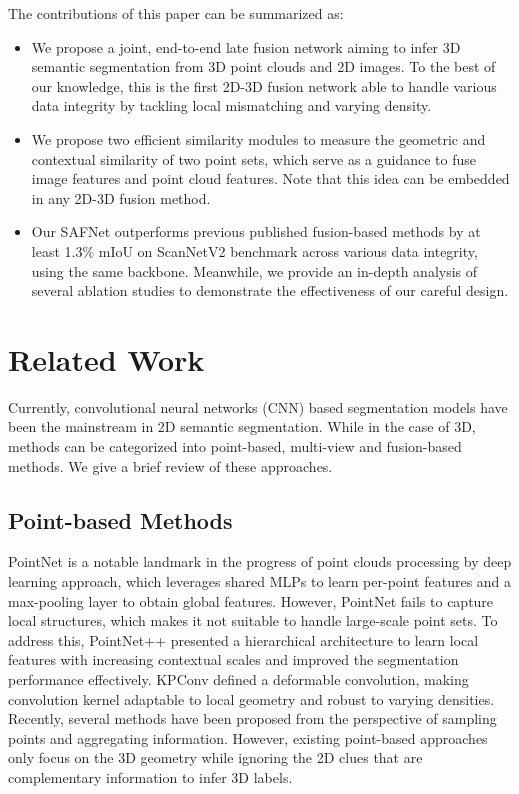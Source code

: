 \documentclass[letterpaper, 10 pt, conference]{ieeeconf}
\begin{document}
The contributions of this paper can be summarized as:
\begin{itemize}

\item We propose a joint, end-to-end late fusion network aiming to infer 3D semantic segmentation from 3D point clouds and 2D images. To the best of our knowledge, this is the first 2D-3D fusion network able to handle various data integrity by tackling local mismatching and varying density.
\item We propose two efficient similarity modules to measure the geometric and contextual similarity of two point sets, which serve as a guidance to fuse image features and point cloud features. Note that this idea can be embedded in any 2D-3D fusion method.
\item  Our SAFNet outperforms previous published fusion-based methods by at least 1.3\% mIoU on ScanNetV2 benchmark across various data integrity, using the same backbone. Meanwhile, we provide an in-depth analysis of several ablation studies to demonstrate the effectiveness of our careful design.

\end{itemize}




\section{Related Work}

Currently, convolutional neural networks (CNN) based segmentation models have been the mainstream in 2D semantic segmentation. While in the case of 3D, methods can be categorized into point-based, multi-view and fusion-based methods. We give a brief review of these approaches.

\subsection{Point-based Methods}


 PointNet \cite{qi2017pointnet} is a notable landmark in the progress of point clouds processing \cite{guo2020deep} by deep learning approach, which leverages shared MLPs to learn per-point features and a max-pooling layer to obtain global features. However, PointNet fails to capture local structures, which makes it not suitable to handle large-scale point sets. To address this, PointNet++ \cite{qi2017pointnet++} presented a hierarchical architecture to learn local features with increasing contextual scales and improved the segmentation performance effectively. 
KPConv \cite{thomas2019kpconv} defined a deformable convolution, making convolution kernel adaptable to local geometry and robust to varying densities. 
 Recently, several methods \cite{hu2019randla,yan2020pointasnl} have been proposed from the perspective of sampling points and aggregating information.
 However, existing point-based approaches only focus on the 3D geometry while ignoring the 2D clues that are complementary information to infer 3D labels.
\end{document}
